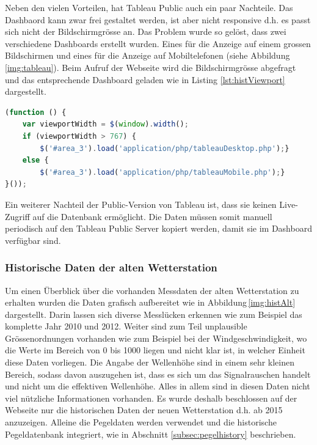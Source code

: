 \noindent
Neben den vielen Vorteilen, hat Tableau Public auch ein paar Nachteile. Das Dashbaord kann zwar frei gestaltet werden, ist aber nicht responsive d.h. es passt sich nicht der Bildschirmgrösse an. Das Problem wurde so gelöst, dass zwei verschiedene Dashboards erstellt wurden. Eines für die Anzeige auf einem grossen Bildschirmen und eines für die Anzeige auf Mobiltelefonen (siehe Abbildung \ref{img:tableau}). Beim Aufruf der Webseite wird die Bildschirmgrösse abgefragt und das entsprechende Dashboard geladen wie in Listing \ref{lst:histViewport} dargestellt.

\vspace{3mm}
\begin{lstlisting}[label=lst:histViewport,caption=Auswahl des Dashboards anhand der Bildschirmgrösse, language=JavaScript, style=htmlcssjs]
(function () {
	var viewportWidth = $(window).width();
	if (viewportWidth > 767) {
		$('#area_3').load('application/php/tableauDesktop.php');}
	else {
		$('#area_3').load('application/php/tableauMobile.php');}
}());
\end{lstlisting}
\vspace{3mm}

\noindent
Ein weiterer Nachteil der Public-Version von Tableau ist, dass sie keinen Live-Zugriff auf die Datenbank ermöglicht. Die Daten müssen somit manuell periodisch auf den Tableau Public Server kopiert werden, damit sie im Dashboard verfügbar sind.


\subsubsection{Historische Daten der alten Wetterstation}
Um einen Überblick über die vorhanden Messdaten der alten Wetterstation zu erhalten wurden die Daten grafisch aufbereitet wie in Abbildung\,\ref{img:histAlt} dargestellt. Darin lassen sich diverse Messlücken erkennen wie zum Beispiel das komplette Jahr 2010 und 2012. Weiter sind zum Teil unplausible Grössenordnungen vorhanden wie zum Beispiel bei der Windgeschwindigkeit, wo die Werte im Bereich von 0 bis 1000 liegen und nicht klar ist, in welcher Einheit diese Daten vorliegen. Die Angabe der Wellenhöhe sind in einem sehr kleinen Bereich, sodass davon auszugehen ist, dass es sich um das Signalrauschen handelt und nicht um die effektiven Wellenhöhe. Alles in allem sind in diesen Daten nicht viel nützliche Informationen vorhanden. Es wurde deshalb beschlossen auf der Webseite nur die historischen Daten der neuen Wetterstation d.h. ab 2015 anzuzeigen. Alleine die Pegeldaten werden verwendet und die historische Pegeldatenbank integriert, wie in Abschnitt \ref{subsec:pegelhistory} beschrieben.

